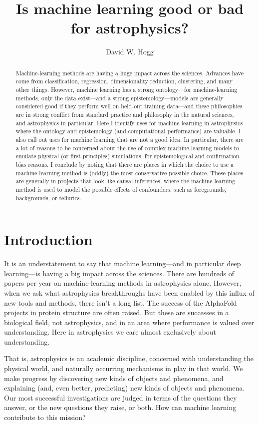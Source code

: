 \documentclass[modern]{aastex631}
\begin{document}
\title{Is machine learning good or bad for astrophysics?}

\author{David W. Hogg}

\begin{abstract}\noindent %
  Machine-learning methods are having a huge impact across the sciences.
  Advances have come from classification, regression, dimensionality reduction, clustering, and many other things.
  However, machine learning has a strong ontology---for machine-learning methods, only the data exist---and a strong epistemology---models are generally considered good if they perform well on held-out training data---and these philosophies are in strong conflict from standard practice and philosophy in the natural sciences, and astrophysics in particular.
  Here I identify uses for machine learning in astrophysics where the ontology and epistemology (and computational performance) are valuable.
  I also call out uses for machine learning that are not a good idea.
  In particular, there are a lot of reasons to be concerned about the use of complex machine-learning models to emulate physical (or first-principles) simulations, for epistemological and confirmation-bias reasons.
  I conclude by noting that there are places in which the choice to use a machine-learning method is (oddly) the most conservative possible choice.
  These places are generally in projects that look like causal inferences, where the machine-learning method is used to model the possible effects of confounders, such as foregrounds, backgrounds, or tellurics.
\end{abstract}

\section{Introduction}\label{sec:intro}

It is an understatement to say that machine learning---and in particular deep learning---is having a big impact across the sciences.
There are hundreds of papers per year on machine-learning methods in astrophysics alone.
However, when we ask what astrophysics breakthroughs have been enabled by this influx of new tools and methods, there isn't a long list.
The success of the AlphaFold projects in protein structure are often raised.
But these are successes in a biological field, not astrophysics, and in an area where performance is valued over understanding.
Here in astrophysics we care almost exclusively about understanding.

That is, astrophysics is an academic discipline, concerned with understanding the physical world, and naturally occurring mechanisms in play in that world.
We make progress by discovering new kinds of objects and phenomena, and explaining (and, even better, predicting) new kinds of objects and phenomena.
Our most successful investigations are judged in terms of the questions they answer, or the new questions they raise, or both.
How can machine learning contribute to this mission?
\end{document}
